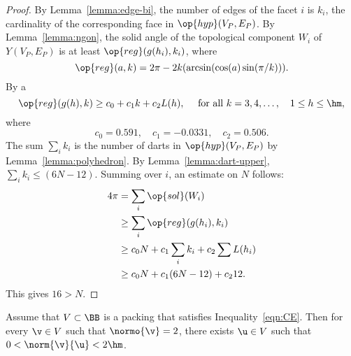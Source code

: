 \begin{proof}
By Lemma~\ref{lemma:edge-bi}, the number of edges of the facet $i$
is $k_i$, the cardinality of the corresponding face in $\op{hyp}(V_P,E_P)$.   
By Lemma~\ref{lemma:ngon}, the solid
angle of the topological component $W_i$ of $Y(V_P,E_P)$ is at least
$\op{reg}(g(h_i),k_i)$, where %
%
%
\[  
\op{reg}(a,k) = 2\pi - 2 k (\arcsin(\cos(a)\sin(\pi/k))).
\] 
By a  
\begin{equation}\label{eqn:alin} 
\op{reg}(g(h),k) \ge c_0 + c_1 k + c_2 L(h),\quad \text{ for all }
k = 3,4,\ldots,\quad 1\le h\le \hm,
\end{equation}
where
\[ 
c_0=0.591,\quad c_1=-0.0331,\quad c_2 = 0.506.
\] The sum $\sum_i k_i$ is the number of darts in $\op{hyp}(V_P,E_P)$
by Lemma~\ref{lemma:polyhedron}.  By Lemma~\ref{lemma:dart-upper},
$\sum_i k_i \le (6N-12)$.  Summing over $i$, an estimate on $N$
follows: %
%
\begin{align*} 
4\pi &= \sum_i\op{sol}(W_i)\\
&\ge \sum_i \op{reg}(g(h_i),k_i) \\
&\ge c_0 N +c_1\sum_i k_i + c_2 \sum L(h_i)\\
&\ge c_0 N +c_1 (6N-12) + c_2 12.
\end{align*}
This gives
$16 > N$.
\end{proof} 


\begin{lemma}[]\label{lemma:D'}  
  Assume that $V\subset \BB$ is a packing that satisfies
  Inequality~\ref{eqn:CE}.  Then
 for every $ \v\in V$ such that $\normo{ \v}=2$, there exists
  $\u\in V$ such that 
$0<\norm{ \v}{ \u}< 2\hm$. 
\end{lemma}

